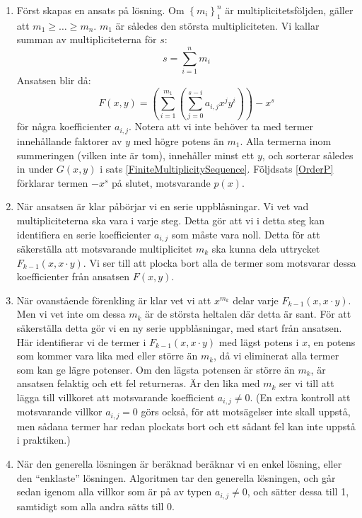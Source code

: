 \begin{enumerate}
\item Först skapas en ansats på lösning. Om $\left\{m_i\right\}_1^n$ är multiplicitetsföljden, gäller att $m_1 \geq \ldots \geq m_n$. $m_1$ är således den största multipliciteten. Vi kallar summan av multipliciteterna för $s$:
\[s=\sum_{i=1}^{n} m_i\]
Ansatsen blir då:
\[F(x,y)=\left(\sum_{i=1}^{m_1}\left(\sum_{j=0}^{s-i} a_{i,j} x^j y^i\right)\right)-x^s\]
för några koefficienter $a_{i,j}$. Notera att vi inte behöver ta med termer innehållande faktorer av $y$ med högre potens än $m_1$. Alla termerna inom summeringen (vilken inte är tom), innehåller minst ett $y$, och sorterar således in under $G(x,y)$ i sats \ref{FiniteMultiplicitySequence}. Följdsats \ref{OrderP} förklarar termen $-x^s$ på slutet, motsvarande $p(x)$.

\item När ansatsen är klar påbörjar vi en serie uppblåsningar. Vi vet vad multipliciteterna ska vara i varje steg. Detta gör att vi i detta steg kan identifiera en serie koefficienter $a_{i,j}$ som måste vara noll. Detta för att säkerställa att motsvarande multiplicitet $m_k$ ska kunna dela uttrycket $F_{k-1}(x,x\cdot y)$. Vi ser till att plocka bort alla de termer som motsvarar dessa koefficienter från ansatsen $F(x,y)$.

\item När ovanstående förenkling är klar vet vi att $x^{m_k}$ delar varje $F_{k-1}(x,x\cdot y)$. Men vi vet inte om dessa $m_k$ är de största heltalen där detta är sant. För att säkerställa detta gör vi en ny serie uppblåsningar, med start från ansatsen. Här identifierar vi de termer i $F_{k-1}(x,x\cdot y)$ med lägst potens i $x$, en potens som kommer vara lika med eller större än $m_k$, då vi eliminerat alla termer som kan ge lägre potenser. Om den lägsta potensen är större än $m_k$, är ansatsen felaktig och ett fel returneras. Är den lika med $m_k$ ser vi till att lägga till villkoret att motsvarande koefficient $a_{i,j} \neq 0$. (En extra kontroll att motsvarande villkor $a_{i,j}=0$ görs också, för att motsägelser inte skall uppstå, men sådana termer har redan plockats bort och ett sådant fel kan inte uppstå i praktiken.)

\item När den generella lösningen är beräknad beräknar vi en enkel lösning, eller den ``enklaste'' lösningen. Algoritmen tar den generella lösningen, och går sedan igenom alla villkor som är på av typen $a_{i,j}\neq 0$, och sätter dessa till 1, samtidigt som alla andra sätts till 0.
\end{enumerate}

